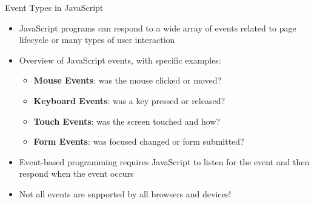 \documentclass[14pt,aspectratio=169]{beamer}
\begin{document}
%
\begin{frame}{Event Types in JavaScript}
  \begin{itemize}
    \item JavaScript programs can respond to a wide array of events related to
      page lifecycle or many types of user interaction
      \vspace*{-.15in}
    \item Overview of JavaScript events, with specific examples:
      \begin{itemize}
        \item {\bf Mouse Events}: was the mouse clicked or moved?
        \item {\bf Keyboard Events}: was a key pressed or released?
        \item {\bf Touch Events}: was the screen touched and how?
        \item {\bf Form Events}: was focused changed or form submitted?
      \end{itemize}
      \vspace*{-.25in}
    \item Event-based programming requires JavaScript to listen for the event
      and then respond when the event occurs
      \vspace*{-.25in}
    \item Not all events are supported by all browsers and devices!
  \end{itemize}
\end{frame}
\end{document}

